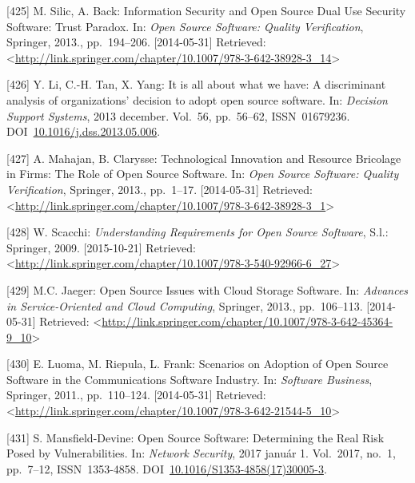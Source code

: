 \documentclass[12pt,magyar,a4paper,oneside]{scrreprt}
\newenvironment{cslreferences}%
  {}%
  {\par}
\begin{document}
\begin{cslreferences}
\leavevmode\hypertarget{ref-silic_information_2013}{}%
{[}425{]} M. Silic, A. Back: Information Security and Open Source Dual
Use Security Software: Trust Paradox. In: \emph{Open Source Software:
Quality Verification}, Springer, 2013., pp.~194--206. {[}2014-05-31{]}
Retrieved:
\textless{}\url{http://link.springer.com/chapter/10.1007/978-3-642-38928-3_14}\textgreater{}

\leavevmode\hypertarget{ref-li_it_2013}{}%
{[}426{]} Y. Li, C.-H. Tan, X. Yang: It is all about what we have: A
discriminant analysis of organizations' decision to adopt open source
software. In: \emph{Decision Support Systems}, 2013 december. Vol.~56,
pp.~56--62, ISSN~01679236.
DOI~\href{https://doi.org/10.1016/j.dss.2013.05.006}{10.1016/j.dss.2013.05.006}.

\leavevmode\hypertarget{ref-mahajan_technological_2013}{}%
{[}427{]} A. Mahajan, B. Clarysse: Technological Innovation and Resource
Bricolage in Firms: The Role of Open Source Software. In: \emph{Open
Source Software: Quality Verification}, Springer, 2013., pp.~1--17.
{[}2014-05-31{]} Retrieved:
\textless{}\url{http://link.springer.com/chapter/10.1007/978-3-642-38928-3_1}\textgreater{}

\leavevmode\hypertarget{ref-scacchi_understanding_2009}{}%
{[}428{]} W. Scacchi: \emph{Understanding Requirements for Open Source
Software}, S.l.: Springer, 2009. {[}2015-10-21{]} Retrieved:
\textless{}\url{http://link.springer.com/chapter/10.1007/978-3-540-92966-6_27}\textgreater{}

\leavevmode\hypertarget{ref-jaeger_open_2013}{}%
{[}429{]} M.C. Jaeger: Open Source Issues with Cloud Storage Software.
In: \emph{Advances in Service-Oriented and Cloud Computing}, Springer,
2013., pp.~106--113. {[}2014-05-31{]} Retrieved:
\textless{}\url{http://link.springer.com/chapter/10.1007/978-3-642-45364-9_10}\textgreater{}

\leavevmode\hypertarget{ref-luoma_scenarios_2011}{}%
{[}430{]} E. Luoma, M. Riepula, L. Frank: Scenarios on Adoption of Open
Source Software in the Communications Software Industry. In:
\emph{Software Business}, Springer, 2011., pp.~110--124.
{[}2014-05-31{]} Retrieved:
\textless{}\url{http://link.springer.com/chapter/10.1007/978-3-642-21544-5_10}\textgreater{}

\leavevmode\hypertarget{ref-mansfield-devine_open_2017}{}%
{[}431{]} S. Mansfield-Devine: Open Source Software: Determining the
Real Risk Posed by Vulnerabilities. In: \emph{Network Security}, 2017
január 1. Vol.~2017, no.~1, pp.~7--12, ISSN~1353-4858.
DOI~\href{https://doi.org/10.1016/S1353-4858(17)30005-3}{10.1016/S1353-4858(17)30005-3}.


\end{cslreferences}
\end{document}
